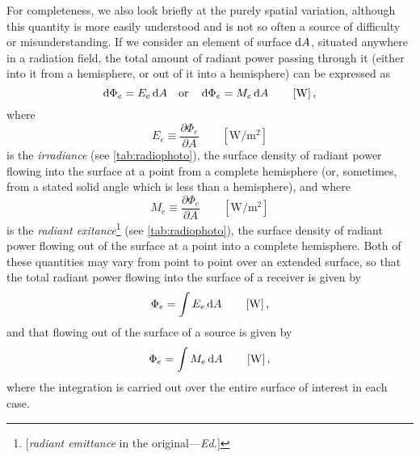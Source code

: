 \begin{refsection}
For completeness, we also look briefly at the purely spatial variation, although
this quantity is more easily understood and is not so often a source of
difficulty
or misunderstanding. If we consider an element of surface $\mathop{}\!\mathrm{d} A$, situated
anywhere
in a radiation field, the total amount of radiant power passing through it
(either
into it from a hemisphere, or out of it into a hemisphere) can be expressed as
\begin{equation*}
\d\Phi_e = E_e \d A \quad \textrm{or} \quad \d\Phi_e = M_e \d A
\qquad \left[\unit{\watt}\right],
\end{equation*}
where
\begin{equation}\label{eqn:nicodemus4}
E_e \equiv \frac{\partial \Phi_e}{\partial A}
\qquad \left[\unit{\watt\per\square\meter}\right]
\end{equation}
is the \textsl{irradiance} (see \cref{tab:radiophoto}), the surface density
of radiant power flowing into the surface at a point from a complete hemisphere
(or, sometimes, from a stated solid angle which is less than a hemisphere), and
where
\begin{equation}\label{eqn:nicodemus5}
M_e \equiv \frac{\partial \Phi_e}{\partial A}
\qquad \left[\unit{\watt\per\square\meter}\right]
\end{equation}
is the \textsl{radiant exitance}\footnote{[\textsl{radiant emittance} in the original---\textit{Ed.}]} (see \cref{tab:radiophoto}), the surface
density of radiant power flowing out of the surface at a point into a complete
hemisphere. Both of these quantities may vary from point to point over an
extended
surface, so that the total radiant power flowing into the surface of a receiver
is given by
\begin{equation}
\Phi_e = \int E_e \d A
\qquad \left[\unit{\watt}\right],
\end{equation}
and that flowing out of the surface of a source is given by
\begin{equation}
\Phi_e = \int M_e \d A
\qquad \left[\unit{\watt}\right],
\end{equation}
where the integration is carried out over the entire surface of interest in each case.



\end{refsection}
